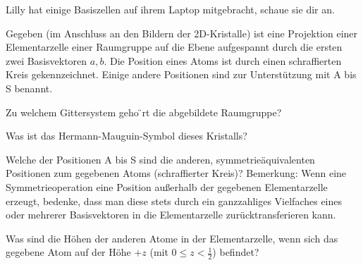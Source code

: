 \begin{sheet}
\begin{problem}
\end{problem}
\begin{problem}[difficulty={sehr leicht}]
	Lilly hat einige Basiszellen auf ihrem Laptop mitgebracht, schaue sie dir an.
\end{problem}

\begin{problem}
	Gegeben (im Anschluss an den Bildern der 2D-Kristalle) ist eine Projektion einer Elementarzelle einer Raumgruppe auf die Ebene aufgespannt durch die ersten zwei Basisvektoren $a,b$. Die Position eines Atoms ist durch einen schraffierten Kreis gekennzeichnet. Einige andere Positionen sind zur Unterstützung mit A bis S benannt.
	\begin{subproblem}
	Zu welchem Gittersystem geho ̈rt die abgebildete Raumgruppe?
	\end{subproblem}
	\begin{subproblem}
	Was ist das Hermann-Mauguin-Symbol dieses Kristalls?
	\end{subproblem}
	\begin{subproblem}
	Welche der Positionen A bis S sind die anderen, symmetrieäquivalenten Positionen zum gegebenen Atoms (schraffierter Kreis)?
	Bemerkung: Wenn eine Symmetrieoperation eine Position außerhalb der gegebenen Elementarzelle erzeugt, bedenke, dass man diese stets durch ein ganzzahliges Vielfaches eines oder mehrerer Basisvektoren in die Elementarzelle zurücktransferieren kann.
	\end{subproblem}
	\begin{subproblem}
		Was sind die Höhen der anderen Atome in der Elementarzelle, wenn sich das gegebene Atom auf der Höhe $+z$ (mit $0 \leq z < \frac{1}{2}$) befindet?
	\end{subproblem}
\end{problem}





\end{sheet}